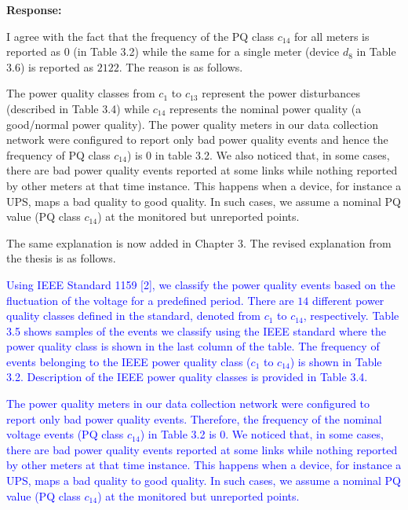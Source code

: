 \documentclass[journal]{IEEEtran}
\begin{document}
\vspace{10pt}
\textbf{Response:}
\begin{adjustwidth}{2.5em}{0pt}
I agree with the fact that the frequency of the PQ class $c_{14}$ for all meters is reported as 0 (in Table 3.2) while the same for a single meter (device $d_8$ in Table 3.6) is reported as $2122$. The reason is as follows.

\vspace{5pt}\noindent The power quality classes from $c_1$ to $c_{13}$ represent the power disturbances (described in Table 3.4) while $c_{14}$ represents the nominal power quality (a good/normal power quality). The power quality meters in our data collection network were configured to report only bad power quality events and hence the frequency of PQ class $c_{14}$) is 0 in table 3.2. We also noticed that, in some cases, there are bad power quality events reported at some links while nothing reported by other meters at that time instance. This happens when a device, for instance a UPS, maps a bad quality to good quality. In such cases, we assume a nominal PQ value (PQ class $c_{14}$) at the monitored but unreported points.

\vspace{5pt}\noindent The same explanation is now added in Chapter 3. The revised explanation from the thesis is as follows.

\vspace{5pt}
\noindent\textcolor{blue}{Using IEEE Standard 1159 [2], we classify the power quality events based on the fluctuation of the voltage for a predefined period. There are $14$ different power quality classes defined in the standard, denoted from $c_1$ to $c_{14}$, respectively. Table 3.5 shows samples of the events we classify using the IEEE standard where the power quality class is shown in the last column of the table. The frequency of events belonging to the IEEE power quality class ($c_1$ to $c_{14}$) is shown in Table 3.2. Description of the IEEE power quality classes is provided in Table 3.4.}

\vspace{5pt}
\noindent\textcolor{blue}{The power quality meters in our data collection network were configured to report only bad power quality events. Therefore, the frequency of the nominal voltage events (PQ class $c_{14}$) in Table 3.2 is 0. We noticed that, in some cases, there are bad power quality events reported at some links while nothing reported by other meters at that time instance. This happens when a device, for instance a UPS, maps a bad quality to good quality. In such cases, we assume a nominal PQ value (PQ class $c_{14}$) at the monitored but unreported points.
}
\end{adjustwidth}
\end{document}
